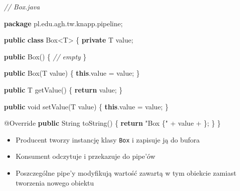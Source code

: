 \documentclass[11pt]{article}
\providecommand{\tightlist}{%
      \setlength{\itemsep}{0pt}\setlength{\parskip}{0pt}}
\newenvironment{Shaded}{}{}
\newcommand{\KeywordTok}[1]{\textcolor[rgb]{0.00,0.44,0.13}{\textbf{{#1}}}}
\newcommand{\DataTypeTok}[1]{\textcolor[rgb]{0.56,0.13,0.00}{{#1}}}
\newcommand{\CharTok}[1]{\textcolor[rgb]{0.25,0.44,0.63}{{#1}}}
\newcommand{\StringTok}[1]{\textcolor[rgb]{0.25,0.44,0.63}{{#1}}}
\newcommand{\CommentTok}[1]{\textcolor[rgb]{0.38,0.63,0.69}{\textit{{#1}}}}
\newcommand{\FunctionTok}[1]{\textcolor[rgb]{0.02,0.16,0.49}{{#1}}}
\newcommand{\NormalTok}[1]{{#1}}
\newcommand{\ImportTok}[1]{{#1}}
\newcommand{\ControlFlowTok}[1]{\textcolor[rgb]{0.00,0.44,0.13}{\textbf{{#1}}}}
\newcommand{\OperatorTok}[1]{\textcolor[rgb]{0.40,0.40,0.40}{{#1}}}
\newcommand{\BuiltInTok}[1]{{#1}}
\newcommand{\AttributeTok}[1]{\textcolor[rgb]{0.49,0.56,0.16}{{#1}}}
\begin{document}
\begin{Shaded}
\begin{Highlighting}[]
\CommentTok{// Box.java}

\KeywordTok{package}\ImportTok{ pl}\OperatorTok{.}\ImportTok{edu}\OperatorTok{.}\ImportTok{agh}\OperatorTok{.}\ImportTok{tw}\OperatorTok{.}\ImportTok{knapp}\OperatorTok{.}\ImportTok{pipeline}\OperatorTok{;}

\KeywordTok{public} \KeywordTok{class} \BuiltInTok{Box}\OperatorTok{\textless{}}\NormalTok{T}\OperatorTok{\textgreater{}} \OperatorTok{\{}
    \KeywordTok{private}\NormalTok{ T value}\OperatorTok{;}

    \KeywordTok{public} \BuiltInTok{Box}\OperatorTok{()} \OperatorTok{\{}
        \CommentTok{// empty}
    \OperatorTok{\}}

    \KeywordTok{public} \BuiltInTok{Box}\OperatorTok{(}\NormalTok{T value}\OperatorTok{)} \OperatorTok{\{}
        \KeywordTok{this}\OperatorTok{.}\FunctionTok{value} \OperatorTok{=}\NormalTok{ value}\OperatorTok{;}
    \OperatorTok{\}}

    \KeywordTok{public}\NormalTok{ T }\FunctionTok{getValue}\OperatorTok{()} \OperatorTok{\{}
        \ControlFlowTok{return}\NormalTok{ value}\OperatorTok{;}
    \OperatorTok{\}}

    \KeywordTok{public} \DataTypeTok{void} \FunctionTok{setValue}\OperatorTok{(}\NormalTok{T value}\OperatorTok{)} \OperatorTok{\{}
        \KeywordTok{this}\OperatorTok{.}\FunctionTok{value} \OperatorTok{=}\NormalTok{ value}\OperatorTok{;}
    \OperatorTok{\}}

    \AttributeTok{@Override}
    \KeywordTok{public} \BuiltInTok{String} \FunctionTok{toString}\OperatorTok{()} \OperatorTok{\{}
        \ControlFlowTok{return} \StringTok{"Box \{"} \OperatorTok{+}\NormalTok{ value }\OperatorTok{+} \CharTok{\textquotesingle{}\}\textquotesingle{}}\OperatorTok{;}
    \OperatorTok{\}}
\OperatorTok{\}}
\end{Highlighting}
\end{Shaded}

\begin{itemize}
\tightlist
\item
  Producent tworzy instancję klasy \texttt{Box} i zapisuje ją do bufora
\item
  Konsument odczytuje i przekazuje do pipe'ów
\item
  Poszczególne pipe'y modyfikują wartość zawartą w tym obiekcie zamiast
  tworzenia nowego obiektu
\end{itemize}
\end{document}
